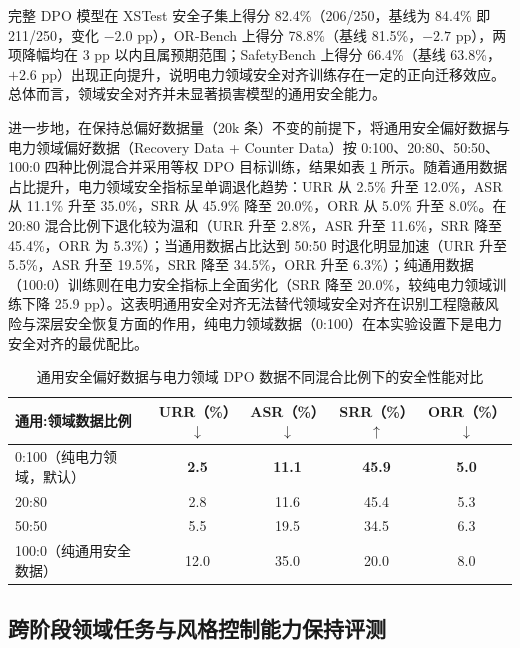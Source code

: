 \documentclass[fontset=fandol,type=master,campus=shenzhen,etitleauto=true]{hithesisbook}
\begin{document}
完整 DPO 模型在 XSTest 安全子集上得分 82.4\%（206/250，基线为 84.4\% 即 211/250，变化 $-2.0$ pp），OR-Bench 上得分 78.8\%（基线 81.5\%，$-2.7$ pp），两项降幅均在 3 pp 以内且属预期范围；SafetyBench 上得分 66.4\%（基线 63.8\%，$+2.6$ pp）出现正向提升，说明电力领域安全对齐训练存在一定的正向迁移效应。总体而言，领域安全对齐并未显著损害模型的通用安全能力。

进一步地，在保持总偏好数据量（20k 条）不变的前提下，将通用安全偏好数据与电力领域偏好数据（Recovery Data + Counter Data）按 0:100、20:80、50:50、100:0 四种比例混合并采用等权 DPO 目标训练，结果如表 \ref{tab:domain-general-safety-mix} 所示。随着通用数据占比提升，电力领域安全指标呈单调退化趋势：URR 从 2.5\% 升至 12.0\%，ASR 从 11.1\% 升至 35.0\%，SRR 从 45.9\% 降至 20.0\%，ORR 从 5.0\% 升至 8.0\%。在 20:80 混合比例下退化较为温和（URR 升至 2.8\%，ASR 升至 11.6\%，SRR 降至 45.4\%，ORR 为 5.3\%）；当通用数据占比达到 50:50 时退化明显加速（URR 升至 5.5\%，ASR 升至 19.5\%，SRR 降至 34.5\%，ORR 升至 6.3\%）；纯通用数据（100:0）训练则在电力安全指标上全面劣化（SRR 降至 20.0\%，较纯电力领域训练下降 25.9 pp）。这表明通用安全对齐无法替代领域安全对齐在识别工程隐蔽风险与深层安全恢复方面的作用，纯电力领域数据（0:100）在本实验设置下是电力安全对齐的最优配比。

\begin{table}[htbp]
\centering
\caption{通用安全偏好数据与电力领域 DPO 数据不同混合比例下的安全性能对比}
\label{tab:domain-general-safety-mix}
\small
\setlength{\tabcolsep}{5pt}
\renewcommand{\arraystretch}{1.15}
\begin{tabular}{l c c c c}
\toprule
\textbf{通用:领域数据比例} & \textbf{URR（\%）$\downarrow$} & \textbf{ASR（\%）$\downarrow$} & \textbf{SRR（\%）$\uparrow$} & \textbf{ORR（\%）$\downarrow$} \\
\midrule
0:100（纯电力领域，默认） & \textbf{2.5} & \textbf{11.1} & \textbf{45.9} & \textbf{5.0} \\
20:80 & 2.8 & 11.6 & 45.4 & 5.3 \\
50:50 & 5.5 & 19.5 & 34.5 & 6.3 \\
100:0（纯通用安全数据） & 12.0 & 35.0 & 20.0 & 8.0 \\
\bottomrule
\end{tabular}
\end{table}

\subsection{跨阶段领域任务与风格控制能力保持评测}\label{cross-stage-retention}
\end{document}
